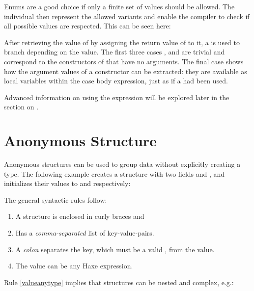 Enums are a good choice if only a finite set of values should be allowed. The individual  then represent the allowed variants and enable the compiler to check if all possible values are respected. This can be seen here:


After retrieving the value of  by assigning the return value of  to it, a  is used to branch depending on the value. The first three cases ,  and  are trivial and correspond to the constructors of  that have no arguments. The final case  shows how the argument values of a constructor can be extracted: they are available as local variables within the case body expression, just as if a  had been used.

Advanced information on using the  expression will be explored later in the section on .


\section{Anonymous Structure}
\label{types-anonymous-structure}

Anonymous structures can be used to group data without explicitly creating a type. The following example creates a structure with two fields  and , and initializes their values to  and  respectively:

The general syntactic rules follow:

\begin{enumerate}
	\item A structure is enclosed in curly braces \expr{$\left\{\right\}$} and
	\item Has a \emph{comma-separated} list of key-value-pairs.
	\item A \emph{colon} separates the key, which must be a valid , from the value.
	\item\label{valueanytype} The value can be any Haxe expression.
\end{enumerate}
Rule \ref{valueanytype} implies that structures can be nested and complex, e.g.:


